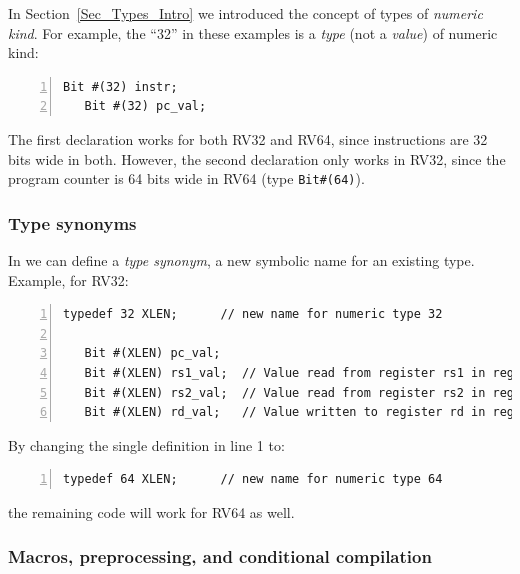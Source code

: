 
In Section~\ref{Sec_Types_Intro} we introduced the concept of types of
\emph{numeric kind}. For example, the ``32'' in these examples is a
\emph{type} (not a \emph{value}) of numeric kind:

{\footnotesize
\begin{Verbatim}[frame=single, numbers=left]
   Bit #(32) instr;
   Bit #(32) pc_val;
\end{Verbatim}
}

The first declaration works for both RV32 and RV64, since instructions
are 32 bits wide in both.  However, the second declaration only works
in RV32, since the program counter is 64 bits wide in RV64 (type
\verb|Bit#(64)|).


\subsubsection{Type synonyms}


In {\BSV} we can define a \emph{type synonym}, a new symbolic name for
an existing type. Example, for RV32:

{\footnotesize
\begin{Verbatim}[frame=single, numbers=left]
   typedef 32 XLEN;      // new name for numeric type 32

   Bit #(XLEN) pc_val;
   Bit #(XLEN) rs1_val;  // Value read from register rs1 in register file
   Bit #(XLEN) rs2_val;  // Value read from register rs2 in register file
   Bit #(XLEN) rd_val;   // Value written to register rd in register file
\end{Verbatim}
}

By changing the single definition in line 1 to:

{\footnotesize
\begin{Verbatim}[frame=single, numbers=left]
   typedef 64 XLEN;      // new name for numeric type 64
\end{Verbatim}
}

the remaining code will work for RV64 as well.


\subsubsection{Macros, preprocessing, and conditional compilation}

